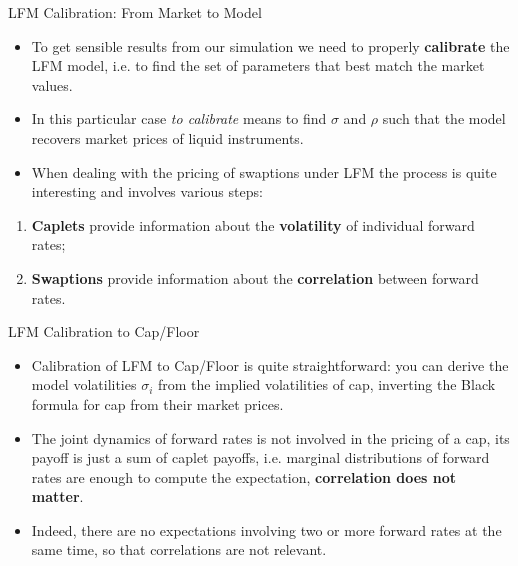 \documentclass{beamer}
\begin{document}
\begin{frame}{LFM Calibration: From Market to Model}
	\begin{itemize}
		\item To get sensible results from our simulation we need to properly \textbf{calibrate} the LFM model, i.e. to find the set of parameters that best match the market values.
		\item In this particular case \emph{to calibrate} means to find $\sigma$ and $\rho$ such that the model recovers market prices of liquid instruments.
		\item When dealing with the pricing of swaptions under LFM the process is quite interesting and involves various steps:
	\end{itemize}
	\vfill
	\begin{enumerate}
		\item \textbf{Caplets} provide information about the \textbf{volatility} of individual forward rates;
		\item \textbf{Swaptions} provide information about the \textbf{correlation} between forward rates.
	\end{enumerate}
\end{frame}

\begin{frame}{LFM Calibration to Cap/Floor}
	\begin{itemize}
		\item Calibration of LFM to Cap/Floor is quite straightforward: you can derive the model volatilities $\sigma_i$ from the implied volatilities of cap, inverting the Black formula for cap from their market prices.
		\item The \textcolor{maincolor}{joint dynamics of forward rates is not involved in the pricing of a cap}, its payoff is just a sum of caplet payoffs, i.e. marginal distributions of forward rates are enough to compute the expectation, \textbf{correlation does not matter}.
		\item Indeed, there are no expectations involving two or more forward rates at the same time, so that correlations are not relevant.
	\end{itemize}
\end{frame}
\end{document}
